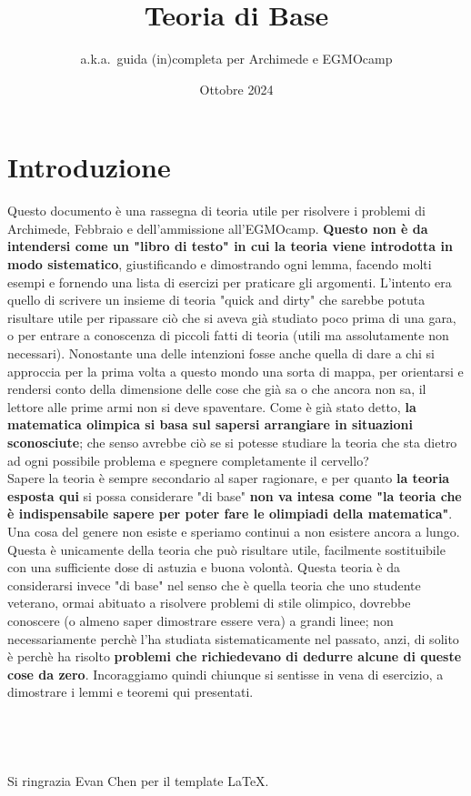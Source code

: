 \documentclass[11pt]{scrartcl}
\begin{document}
	\title{Teoria di Base}
	\subtitle{a.k.a.\ guida (in)completa per Archimede e EGMOcamp}
	\date{Ottobre 2024}
	
	
	\maketitle
	\section*{Introduzione}
	Questo documento è una rassegna di teoria utile per risolvere i problemi di Archimede, Febbraio e dell'ammissione all'EGMOcamp. \textbf{Questo non è da intendersi come un "libro di testo" in cui la teoria viene introdotta in modo sistematico}, giustificando e dimostrando ogni lemma, facendo molti esempi e fornendo una lista di esercizi per praticare gli argomenti. L'intento era quello di scrivere un insieme di teoria "quick and dirty" che sarebbe potuta risultare utile per ripassare ciò che si aveva già studiato poco prima di una gara, o per entrare a conoscenza di piccoli fatti di teoria (utili ma assolutamente non necessari). Nonostante una delle intenzioni fosse anche quella di dare a chi si approccia per la prima volta a questo mondo una sorta di mappa, per orientarsi e rendersi conto della dimensione delle cose che già sa o che ancora non sa, il lettore alle prime armi non si deve spaventare. Come è già stato detto, \textbf{la matematica olimpica si basa sul sapersi arrangiare in situazioni sconosciute}; che senso avrebbe ciò se si potesse studiare la teoria che sta dietro ad ogni possibile problema e spegnere completamente il cervello? \\
	Sapere la teoria è sempre secondario al saper ragionare, e per quanto \textbf{la teoria esposta qui} si possa considerare "di base" \textbf{non va intesa come "la teoria che è indispensabile sapere per poter fare le olimpiadi della matematica"}. Una cosa del genere non esiste e speriamo continui a non esistere ancora a lungo. Questa è unicamente della teoria che può risultare utile, facilmente sostituibile con una sufficiente dose di astuzia e buona volontà. Questa teoria è da considerarsi invece "di base" nel senso che è quella teoria che uno studente veterano, ormai abituato a risolvere problemi di stile olimpico, dovrebbe conoscere (o almeno saper dimostrare essere vera) a grandi linee; non necessariamente perchè l'ha studiata sistematicamente nel passato, anzi, di solito è perchè ha risolto \textbf{problemi che richiedevano di dedurre alcune di queste cose da zero}. Incoraggiamo quindi chiunque si sentisse in vena di esercizio, a dimostrare i lemmi e teoremi qui presentati. \\
	\\
	\\
	\\
	\\
	Si ringrazia Evan Chen per il template \LaTeX.
	\newpage
	\tableofcontents
	\newpage
\end{document}
